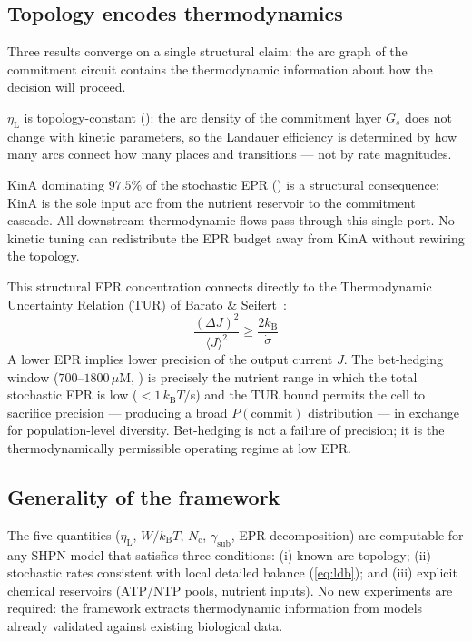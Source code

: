 \documentclass[11pt,a4paper]{article}
\newcommand{\kB}{k_{\mathrm{B}}}
\newcommand{\EPR}{\dot{\sigma}}
\newcommand{\etaL}{\eta_{\mathrm{L}}}
\newcommand{\gsub}{\gamma_{\mathrm{sub}}}
\newcommand{\Nc}{N_{\mathrm{c}}}
\begin{document}
\subsection{Topology encodes thermodynamics}

Three results converge on a single structural claim: the arc graph of
the commitment circuit contains the thermodynamic information about
how the decision will proceed.

$\etaL$ is topology-constant (): the arc density
of the commitment layer $G_s$ does not change with kinetic parameters,
so the Landauer efficiency is determined by how many arcs connect how
many places and transitions --- not by rate magnitudes.

KinA dominating $97.5\%$ of the stochastic EPR ()
is a structural consequence: KinA is the sole input arc from the
nutrient reservoir to the commitment cascade.
All downstream thermodynamic flows pass through this single port.
No kinetic tuning can redistribute the EPR budget away from KinA
without rewiring the topology.

This structural EPR concentration connects directly to the
Thermodynamic Uncertainty Relation (TUR) of
Barato \& Seifert~\cite{Barato2015}:
\begin{equation}
  \frac{(\Delta J)^2}{\langle J \rangle^2} \geq \frac{2\kB}{\EPR}
  \label{eq:tur}
\end{equation}
A lower EPR implies lower precision of the output current $J$.
The bet-hedging window ($700$--$1800\,\mu$M, ) is precisely
the nutrient range in which the total stochastic EPR is low
($< 1\,\kB T$/s) and the TUR bound permits the cell to sacrifice
precision --- producing a broad $P(\mathrm{commit})$ distribution ---
in exchange for population-level diversity.
Bet-hedging is not a failure of precision; it is the thermodynamically
permissible operating regime at low EPR.

\subsection{Generality of the framework}

The five quantities ($\etaL$, $W/\kB T$, $\Nc$, $\gsub$, EPR decomposition)
are computable for any SHPN model that satisfies three conditions:
(i) known arc topology;
(ii) stochastic rates consistent with local detailed balance
(\cref{eq:ldb}); and
(iii) explicit chemical reservoirs (ATP/NTP pools, nutrient inputs).
No new experiments are required: the framework extracts thermodynamic
information from models already validated against existing biological data.
\end{document}
